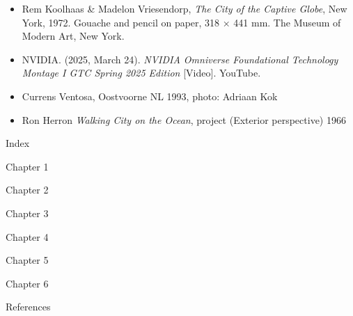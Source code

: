 \documentclass[
  letterpaper,
  DIV=11,
  numbers=noendperiod]{scrreprt}
\begin{document}
\begin{itemize}
  specification for 3D building models. \emph{Computers, Environment and
  Urban Systems}, 59, 25--37.
\item
  Rem Koolhaas \& Madelon Vriesendorp, \emph{The City of the Captive
  Globe}, New York, 1972. Gouache and pencil on paper, 318 × 441 mm. The
  Museum of Modern Art, New York.
\item
  NVIDIA. (2025, March 24). \emph{NVIDIA Omniverse Foundational
  Technology Montage I GTC Spring 2025 Edition} {[}Video{]}. YouTube.
\item
  Currens Ventosa, Oostvoorne NL 1993, photo: Adriaan Kok
\item
  Ron Herron \emph{Walking City on the Ocean}, project (Exterior
  perspective) 1966
\end{itemize}

Index

Chapter 1

Chapter 2

Chapter 3

Chapter 4

Chapter 5

Chapter 6

References
\end{document}
